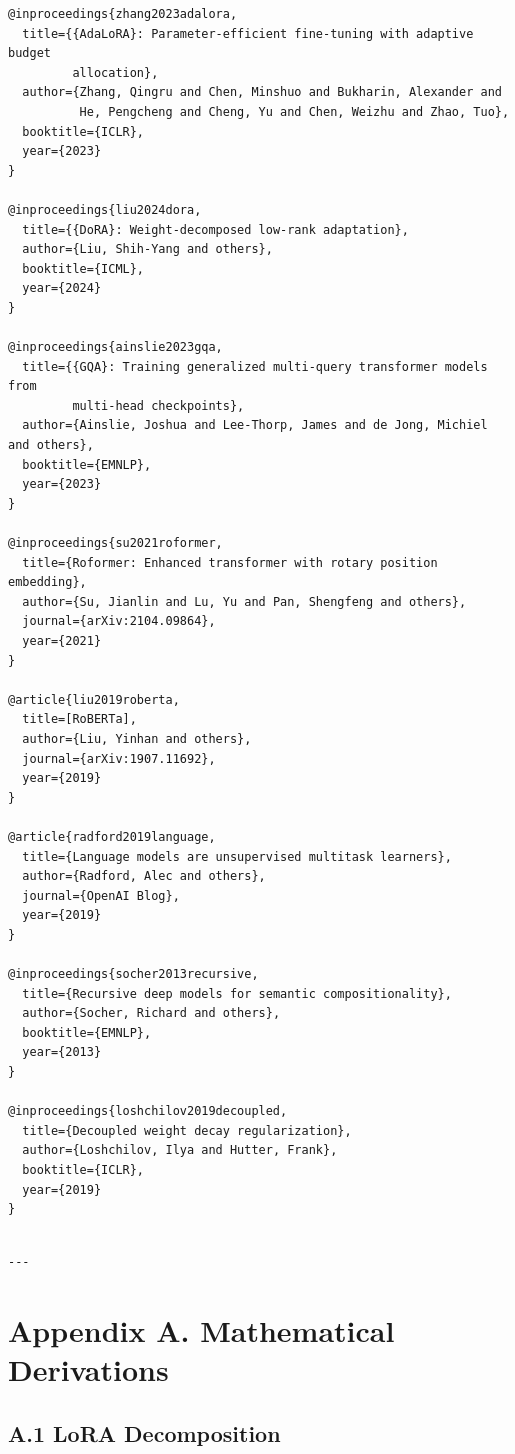 \begin{lstlisting}
@inproceedings{zhang2023adalora,
  title={{AdaLoRA}: Parameter-efficient fine-tuning with adaptive budget 
         allocation},
  author={Zhang, Qingru and Chen, Minshuo and Bukharin, Alexander and 
          He, Pengcheng and Cheng, Yu and Chen, Weizhu and Zhao, Tuo},
  booktitle={ICLR},
  year={2023}
}

@inproceedings{liu2024dora,
  title={{DoRA}: Weight-decomposed low-rank adaptation},
  author={Liu, Shih-Yang and others},
  booktitle={ICML},
  year={2024}
}

@inproceedings{ainslie2023gqa,
  title={{GQA}: Training generalized multi-query transformer models from 
         multi-head checkpoints},
  author={Ainslie, Joshua and Lee-Thorp, James and de Jong, Michiel and others},
  booktitle={EMNLP},
  year={2023}
}

@inproceedings{su2021roformer,
  title={Roformer: Enhanced transformer with rotary position embedding},
  author={Su, Jianlin and Lu, Yu and Pan, Shengfeng and others},
  journal={arXiv:2104.09864},
  year={2021}
}

@article{liu2019roberta,
  title=[RoBERTa],
  author={Liu, Yinhan and others},
  journal={arXiv:1907.11692},
  year={2019}
}

@article{radford2019language,
  title={Language models are unsupervised multitask learners},
  author={Radford, Alec and others},
  journal={OpenAI Blog},
  year={2019}
}

@inproceedings{socher2013recursive,
  title={Recursive deep models for semantic compositionality},
  author={Socher, Richard and others},
  booktitle={EMNLP},
  year={2013}
}

@inproceedings{loshchilov2019decoupled,
  title={Decoupled weight decay regularization},
  author={Loshchilov, Ilya and Hutter, Frank},
  booktitle={ICLR},
  year={2019}
}
\end{lstlisting}
\begin{lstlisting}

---
\end{lstlisting}


\section{Appendix A. Mathematical Derivations}

\subsection{A.1 LoRA Decomposition}

